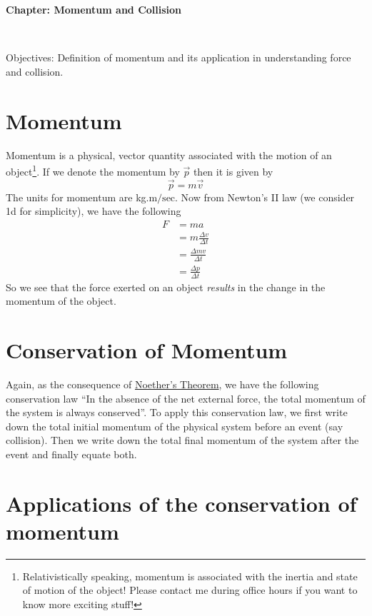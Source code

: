 \documentclass[10pt]{article}
\date{2014-6-22}
\begin{document}
\begin{center}
\begin{Large}\textbf{Chapter: Momentum and Collision}\end{Large} \\
\smallskip
\end{center}
Objectives: Definition of momentum and its application in understanding force and collision.
\section{Momentum}
Momentum is a physical, vector quantity associated with the motion of an object\footnote{Relativistically speaking, momentum is associated with the inertia and state of motion of the object!  Please contact me during office hours if you want to know more exciting stuff!}.  If we denote the momentum by $\vec{p}$ then it is given by
\begin{equation}
  \vec{p} = m\vec{v}
\end{equation}
The units for momentum are kg.$\text{m}/\text{sec}$.  Now from Newton's II law (we consider 1d for simplicity), we have the following
\begin{equation}
  \begin{split}
    F &= ma\\
    &= m\frac{\Delta v}{\Delta t}\\
    &= \frac{\Delta mv}{\Delta t}\\
    &= \frac{\Delta p}{\Delta t}
  \end{split}
\end{equation}
So we see that the force exerted on an object \emph{results} in the change in the momentum of the object.  
\section{Conservation of Momentum}
Again, as the consequence of \href{https://en.wikipedia.org/wiki/Noether%27s_theorem}{Noether's Theorem}, we have the following conservation law
``In the absence of the net external force, the total momentum of the system is always conserved''.  To apply this conservation law, we first write down the total initial momentum of the physical system before an event (say collision).  Then we write down the total final momentum of the system after the event and finally equate both.

\section{Applications of the conservation of momentum}
\end{document}
